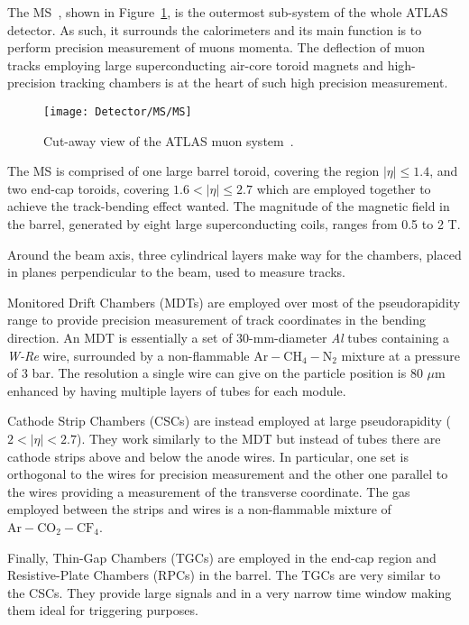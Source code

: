 			The MS~\cite{MSTDR}, shown in Figure~\ref{fig:MS}, is the outermost sub-system of the whole ATLAS detector. As such, it surrounds the calorimeters and its main function is to perform precision measurement of muons momenta. The deflection of muon tracks employing large superconducting air-core toroid magnets and high-precision tracking chambers is at the heart of such high precision measurement. 

			\begin{figure}[!htb]
				\centering
				\texttt{[image: Detector/MS/MS]}
				\caption{Cut-away view of the ATLAS muon system~\cite{ATLASJINST}.}
				\label{fig:MS}
			\end{figure}

			The MS is comprised of one large barrel toroid, covering the region $\left| \eta \right | \leq 1.4$, and two end-cap toroids, covering $1.6 < \left| \eta \right| \leq 2.7$ which are employed together to achieve the track-bending effect wanted. The magnitude of the magnetic field in the barrel, generated by eight large superconducting coils, ranges from 0.5 to 2 T. 

			Around the beam axis, three cylindrical layers make way for the chambers, placed in planes perpendicular to the beam, used to measure tracks. 

			Monitored Drift Chambers (MDTs) are employed over most of the pseudorapidity range to provide precision measurement of track coordinates in the bending direction. An MDT is essentially a set of 30-mm-diameter \emph{Al} tubes containing a \emph{W-Re} wire, surrounded by a non-flammable $\mathrm{Ar-CH_4-N_2}$ mixture at a pressure of 3 bar. The resolution a single wire can give on the particle position is 80 $\mu$m enhanced by having multiple layers of tubes for each module.
			
			Cathode Strip Chambers (CSCs) are instead employed at large pseudorapidity ($2 < \left | \eta \right | < 2.7$). They work similarly to the MDT but instead of tubes there are cathode strips above and below the anode wires. In particular, one set is orthogonal to the wires for precision measurement and the other one parallel to the wires providing a measurement of the transverse coordinate. The gas employed between the strips and wires is a non-flammable mixture of $\mathrm{Ar-CO_2-CF_4}$.

			Finally, Thin-Gap Chambers (TGCs) are employed in the end-cap region and Resistive-Plate Chambers (RPCs) in the barrel. The TGCs are very similar to the CSCs. They provide large signals and in a very narrow time window making them ideal for triggering purposes.

